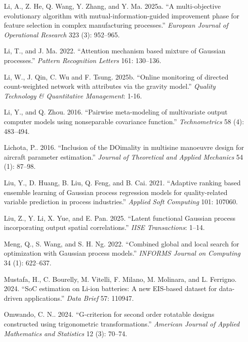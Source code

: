\documentclass[]{interact}
\theoremstyle{plain}%
\theoremstyle{definition}
\theoremstyle{remark}
\begin{document}
\begin{thebibliography}{}
Li, A., Z. He, Q. Wang, Y. Zhang, and Y. Ma. 2025a. ``A multi-objective evolutionary algorithm with mutual-information-guided improvement phase for feature selection in complex manufacturing processes.'' \emph{European Journal of Operational Research} 323 (3): 952--965.

Li, T., and J. Ma. 2022. ``Attention mechanism based mixture of Gaussian processes.'' \emph{Pattern Recognition Letters} 161: 130--136.

Li, W., J. Qin, C. Wu and F. Tsung. 2025b. ``Online monitoring of directed count-weighted network with attributes via the gravity model.''  \emph{Quality Technology \& Quantitative Management}: 1-16.

Li, Y., and Q. Zhou. 2016. ``Pairwise meta-modeling of multivariate output computer models using nonseparable covariance function.'' \emph{Technometrics} 58 (4): 483--494.

Lichota, P.. 2016. ``Inclusion of the DOimality in multisine manoeuvre design for aircraft parameter estimation.'' \emph{Journal of Theoretical and Applied Mechanics} 54 (1): 87--98.

Liu, Y., D. Huang, B. Liu, Q. Feng, and B. Cai. 2021. ``Adaptive ranking based ensemble learning of Gaussian process regression models for quality-related variable prediction in process industries.'' \emph{Applied Soft Computing} 101: 107060.

Liu, Z., Y. Li, X. Yue, and E. Pan. 2025. ``Latent functional Gaussian process incorporating output spatial correlations.'' \emph{IISE Transactions}: 1--14.

Meng, Q., S. Wang, and S. H. Ng. 2022. ``Combined global and local search for optimization with Gaussian process models.'' \emph{INFORMS Journal on Computing} 34 (1): 622--637.

Mustafa, H., C. Bourelly, M. Vitelli, F. Milano, M. Molinara, and L. Ferrigno. 2024. ``SoC estimation on Li-ion batteries: A new EIS-based dataset for data-driven applications.'' \emph{Data Brief} 57: 110947.

Omwando, C. N.. 2024. ``G-criterion for second order rotatable designs constructed using trigonometric transformations.'' \emph{American Journal of Applied Mathematics and Statistics} 12 (3): 70--74.


\end{thebibliography}
\end{document}
